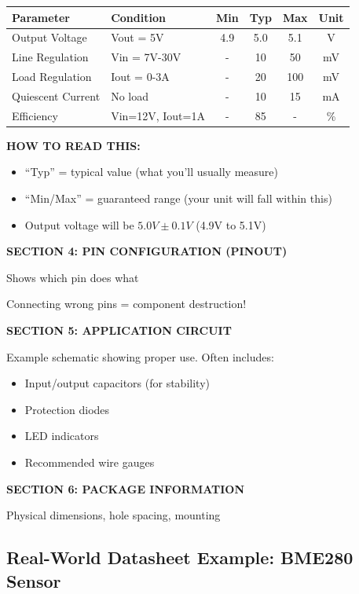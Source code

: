 \documentclass[11pt,letterpaper]{article}
\begin{document}
\begin{center}
\begin{tabular}{|l|l|c|c|c|c|}
\hline
\textbf{Parameter} & \textbf{Condition} & \textbf{Min} & \textbf{Typ} & \textbf{Max} & \textbf{Unit} \\
\hline
Output Voltage & Vout = 5V & 4.9 & 5.0 & 5.1 & V \\
\hline
Line Regulation & Vin = 7V-30V & - & 10 & 50 & mV \\
\hline
Load Regulation & Iout = 0-3A & - & 20 & 100 & mV \\
\hline
Quiescent Current & No load & - & 10 & 15 & mA \\
\hline
Efficiency & Vin=12V, Iout=1A & - & 85 & - & \% \\
\hline
\end{tabular}
\end{center}

\textbf{HOW TO READ THIS:}
\begin{itemize}
\item ``Typ'' = typical value (what you'll usually measure)
\item ``Min/Max'' = guaranteed range (your unit will fall within this)
\item Output voltage will be $5.0V \pm 0.1V$ (4.9V to 5.1V)
\end{itemize}

\textbf{SECTION 4: PIN CONFIGURATION (PINOUT)}

Shows which pin does what

\begin{warningbox}
Connecting wrong pins = component destruction!
\end{warningbox}

\textbf{SECTION 5: APPLICATION CIRCUIT}

Example schematic showing proper use. Often includes:
\begin{itemize}
\item Input/output capacitors (for stability)
\item Protection diodes
\item LED indicators
\item Recommended wire gauges
\end{itemize}

\textbf{SECTION 6: PACKAGE INFORMATION}

Physical dimensions, hole spacing, mounting

\subsection{Real-World Datasheet Example: BME280 Sensor}
\end{document}
